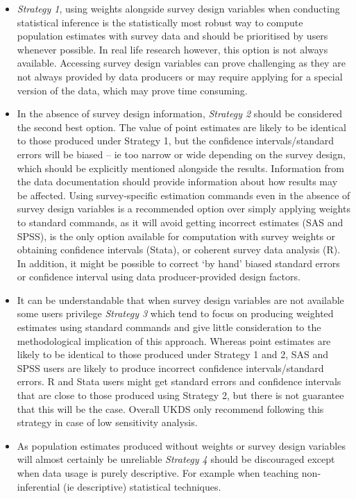 \documentclass[
  14,
  a4paper,
  DIV=11,
  numbers=noendperiod]{scrartcl}
\begin{document}
\begin{itemize}
\item
  \emph{Strategy 1}, using weights alongside survey design variables
  when conducting statistical inference is the statistically most robust
  way to compute population estimates with survey data and should be
  prioritised by users whenever possible. In real life research however,
  this option is not always available. Accessing survey design variables
  can prove challenging as they are not always provided by data
  producers or may require applying for a special version of the data,
  which may prove time consuming.
\item
  In the absence of survey design information, \emph{Strategy 2} should
  be considered the second best option. The value of point estimates are
  likely to be identical to those produced under Strategy 1, but the
  confidence intervals/standard errors will be biased -- ie too narrow
  or wide depending on the survey design, which should be explicitly
  mentioned alongside the results. Information from the data
  documentation should provide information about how results may be
  affected. Using survey-specific estimation commands even in the
  absence of survey design variables is a recommended option over simply
  applying weights to standard commands, as it will avoid getting
  incorrect estimates (SAS and SPSS), is the only option available for
  computation with survey weights or obtaining confidence intervals
  (Stata), or coherent survey data analysis (R). In addition, it might
  be possible to correct `by hand' biased standard errors or confidence
  interval using data producer-provided design factors.
\item
  It can be understandable that when survey design variables are not
  available some users privilege \emph{Strategy 3} which tend to focus
  on producing weighted estimates using standard commands and give
  little consideration to the methodological implication of this
  approach. Whereas point estimates are likely to be identical to those
  produced under Strategy 1 and 2, SAS and SPSS users are likely to
  produce incorrect confidence intervals/standard errors. R and Stata
  users might get standard errors and confidence intervals that are
  close to those produced using Strategy 2, but there is not guarantee
  that this will be the case. Overall UKDS only recommend following this
  strategy in case of low sensitivity analysis.
\item
  As population estimates produced without weights or survey design
  variables will almost certainly be unreliable \emph{Strategy 4} should
  be discouraged except when data usage is purely descriptive. For
  example when teaching non-inferential (ie descriptive) statistical
  techniques.
\end{itemize}
\end{document}
